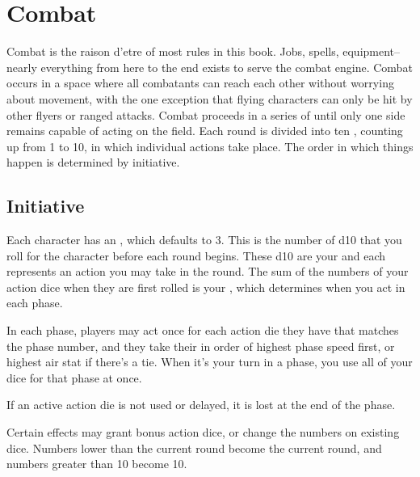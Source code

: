
\section{Combat}\label{sec:combat}
\begin{multicols}{2}
    Combat is the raison d’etre of most rules in this book. Jobs, spells, equipment-- nearly everything from here to the end exists to serve the combat engine. Combat occurs in a space where all combatants can reach each other without worrying about movement, with the one exception that flying characters can only be hit by other flyers or ranged attacks. Combat proceeds in a series of  until only one side remains capable of acting on the field. Each round is divided into ten , counting up from 1 to 10, in which individual actions take place. The order in which things happen is determined by initiative.


    \subsection{Initiative}\label{subsec:init}

        Each character has an , which defaults to 3. This is the number of d10 that you roll for the character before each round begins. These d10 are your  and each represents an action you may take in the round. The sum of the numbers of your action dice when they are first rolled is your , which determines when you act in each phase.

        In each phase, players may act once for each action die they have that matches the phase number, and they take their  in order of highest phase speed first, or highest air stat if there's a tie. When it's your turn in a phase, you use all of your dice for that phase at once. 

        If an active action die is not used or delayed, it is lost at the end of the phase.

        Certain effects may grant bonus action dice, or change the numbers on existing dice. Numbers lower than the current round become the current round, and numbers greater than 10 become 10.


\end{multicols}
